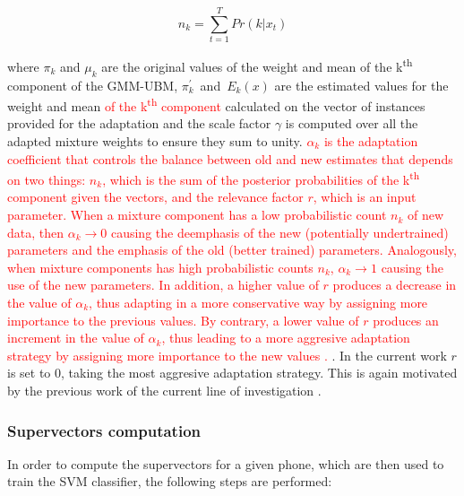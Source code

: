 \begin{equation}
  n_{k} = \sum_{t=1}^{T} Pr(k|x_{t})
\end{equation}

where $\pi_{k}$ and $\mu_{k}$ are the original values of the weight and mean of the
k\textsuperscript{th} component of the GMM-UBM, \mbox{$\pi_{k}^{'}$ and $E_{k}(x)$} are
the estimated values for the weight and mean
\textcolor{red}{of the k\textsuperscript{th} component}
calculated on the vector of instances provided
for the adaptation and the scale factor $\gamma$ is computed over all the
adapted mixture weights to ensure they sum to unity. \textcolor{red}{
  $\alpha_{k}$ is the adaptation
  coefficient that controls the balance between old and new estimates that depends on
  two things: $n_{k}$, which is the sum of the posterior probabilities
  of the k\textsuperscript{th} component given the vectors, and
  the relevance factor $r$, which is an input parameter.
  When a mixture component has a low probabilistic count $n_{k}$ of new data, then
  $\alpha_{k} \to 0$ causing the deemphasis of the new (potentially undertrained) parameters
  and the emphasis of the old (better trained) parameters. Analogously,
  when mixture components has
  high probabilistic counts $n_{k}$, $\alpha_{k} \to 1$ causing the use of the new parameters.
  In addition, a higher value of $r$ produces a decrease in the value
  of $\alpha_{k}$, thus adapting in a more conservative way by assigning more importance
  to the previous values. By contrary, a lower value of $r$ produces an increment in the value
  of $\alpha_{k}$, thus leading to a more aggresive adaptation strategy by assigning more importance
  to the new values \textcolor{red}{\cite{ubm_adaptation}}.
}. In the current work $r$ is set to 0, taking the most aggresive
adaptation strategy. This is again motivated by the previous work of the current
line of investigation \cite{main}.

\subsubsection{Supervectors computation} \label{subsubsection:supervectors}

In order to compute the supervectors for a given phone, which are then used to train the SVM
classifier, the following steps are performed:

